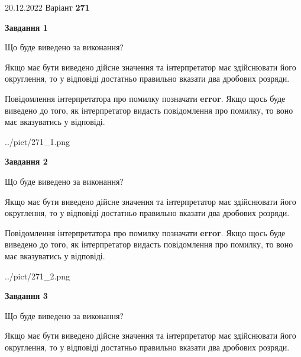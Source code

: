 \documentclass[12pt, ukrainian]{article}
\begin{document}
{20.12.2022 Варіант \No \textbf { 271 }\par}
{
\begin {Large}

{\begin {center}\textbf{Завдання 1}\end {center}}\par
Що буде виведено за виконання? \par

Якщо має бути виведено дійсне значення та інтерпретатор має здійснювати його округлення, 
то у відповіді достатньо правильно вказати два дробових розряди.

Повідомлення інтерпретатора про помилку позначати \textbf{error}.
Якщо щось буде виведено до того, як інтерпретатор видасть повідомлення про помилку, 
то воно має вказуватись у відповіді. \par

\begin{center}
	{../pict/271_1.png}
\end{center}
\newpage

{\begin {center}\textbf{Завдання 2}\end {center}}\par
Що буде виведено за виконання? \par

Якщо має бути виведено дійсне значення та інтерпретатор має здійснювати його округлення, 
то у відповіді достатньо правильно вказати два дробових розряди.

Повідомлення інтерпретатора про помилку позначати \textbf{error}.
Якщо щось буде виведено до того, як інтерпретатор видасть повідомлення про помилку, 
то воно має вказуватись у відповіді. \par

\begin{center}
	{../pict/271_2.png}
\end{center}
\newpage

{\begin {center}\textbf{Завдання 3}\end {center}}\par
Що буде виведено за виконання? \par

Якщо має бути виведено дійсне значення та інтерпретатор має здійснювати його округлення, 
то у відповіді достатньо правильно вказати два дробових розряди.


\end{Large}}
\end{document}
